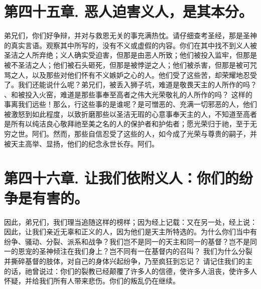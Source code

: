 
\section{第四十五章. 恶人迫害义人，是其本分。}

弟兄们，你们好争辩，并对与救恩无关的事充满热忱。请仔细查考圣经，那是圣神的真实言语。观察其中所写的，没有不义或虚假的内容。你们在其中找不到义人被圣洁之人所弃绝；义人确实受迫害，但那是由恶人所致；他们被投入监牢，但那是被不圣洁之人；他们被石头砸死，但那是被悖逆之人；他们被杀害，但那是被可咒骂之人，以及那些对他们怀有不义嫉妒之心的人。他们受了这些苦，却荣耀地忍受了。我们还能说什么呢？弟兄们，被丢入狮子坑，难道是敬畏天主的人所作的吗？ 、和被投入火窑，难道是那些事奉至高者之伟大光荣敬礼的人所作的吗？ 这样的事离我们远些！那么，行这些事的是谁呢？是可憎恶的、充满一切邪恶的人，他们被激怒到如此程度，以致折磨那些以圣洁无瑕的心意事奉天主的人，不知道至高者是所有以纯洁良心敬拜祂至美之名的人的保护者和护佑者；愿光荣归于祂，至于无穷之世。阿们。然而，那些自信忍受了这些的人，如今成了光荣与尊贵的嗣子，并被天主高举、显扬，他们的纪念永世长存。阿们。\par


\section{第四十六章. 让我们依附义人：你们的纷争是有害的。}

因此，弟兄们，我们理当追随这样的榜样；因为经上记载：又在另一处，经上说：因此，让我们亲近无辜和正义的人，因为他们是天主所特选的。为什么你们当中有纷争、骚动、分裂、派系和战争？我们岂不是同一的天主和同一的基督？岂不是同一的恩宠的圣神倾注在我们身上？岂不同有一在基督内的召叫？ 我们为什么分裂并撕碎基督的肢体，对自己的身体兴起纷争，乃至疯狂到忘记？ 请记住我们的主的话，祂曾说过：你们的裂教已经颠覆了许多人的信德，使许多人沮丧，使许多人怀疑，并给我们所有人带来悲伤。你们的叛乱仍在继续。\par

